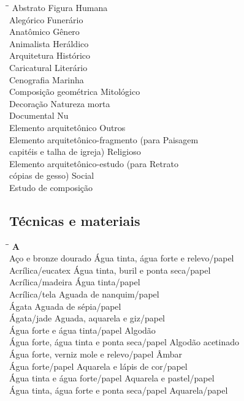 \begin{tabbing}
	\hspace{8,7cm}\=\hspace{1cm}\=\kill
	Abstrato \> Figura Humana \\ 
	Alegórico	\> Funerário\\ 
	Anatômico \> Gênero\\
	Animalista \> Heráldico\\
	Arquitetura \> Histórico \\ 
	Caricatural	\> Literário\\ 
	Cenografia \> Marinha\\
	Composição geométrica \> Mitológico\\
	Decoração \> Natureza morta \\ 
	Documental	\> Nu\\ 
	Elemento arquitetônico \> Outros\\
	Elemento arquitetônico-fragmento (para  \> Paisagem\\   
	capitéis e talha de igreja) \> Religioso\\
	Elemento arquitetônico-estudo (para  \> Retrato\\   
	cópias de gesso) \> Social\\
	Estudo de composição  \> \\
\end{tabbing}

\subsection{Técnicas e materiais}

\begin{tabbing}
	\hspace{8,7cm}\=\hspace{1cm}\=\kill
	\textbf{A} \>  \\ 
	Aço e bronze dourado	\> Água tinta, água forte e relevo/papel\\ 
	Acrílica/eucatex \> Água tinta, buril e ponta seca/papel\\
	Acrílica/madeira \> Água tinta/papel\\
	Acrílica/tela  \> Aguada de nanquim/papel\\ 
	Ágata \> Aguada de sépia/papel \\ 
	Ágata/jade	\> Aguada, aquarela e giz/papel\\ 
	Água forte e água tinta/papel \> Algodão\\
	Água forte, água tinta e ponta seca/papel \> Algodão acetinado \\
	Água forte, verniz mole e relevo/papel \> Âmbar \\ 
	Água forte/papel	\> Aquarela e lápis de cor/papel\\ 
	Água tinta e água forte/papel \> Aquarela e pastel/papel\\
	Água tinta, água forte e ponta seca/papel  \> Aquarela/papel\\	   
\end{tabbing}

